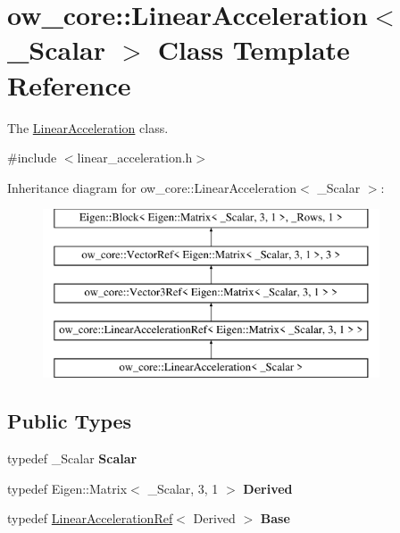 \hypertarget{classow__core_1_1LinearAcceleration}{}\section{ow\+\_\+core\+:\+:Linear\+Acceleration$<$ \+\_\+\+Scalar $>$ Class Template Reference}
\label{classow__core_1_1LinearAcceleration}


The \hyperlink{classow__core_1_1LinearAcceleration}{Linear\+Acceleration} class.  




{\ttfamily \#include $<$linear\+\_\+acceleration.\+h$>$}

Inheritance diagram for ow\+\_\+core\+:\+:Linear\+Acceleration$<$ \+\_\+\+Scalar $>$\+:\begin{figure}[H]
\begin{center}
\leavevmode
\includegraphics[height=5.000000cm]{d2/d41/classow__core_1_1LinearAcceleration}
\end{center}
\end{figure}
\subsection*{Public Types}
\begin{DoxyCompactItemize}
\item 
typedef \+\_\+\+Scalar {\bfseries Scalar}\hypertarget{classow__core_1_1LinearAcceleration_a11f5e96fae3ce2a9833d73dc64a9854c}{}\label{classow__core_1_1LinearAcceleration_a11f5e96fae3ce2a9833d73dc64a9854c}

\item 
typedef Eigen\+::\+Matrix$<$ \+\_\+\+Scalar, 3, 1 $>$ {\bfseries Derived}\hypertarget{classow__core_1_1LinearAcceleration_a964ade2d7efcfa7dd3876e779ccd13c5}{}\label{classow__core_1_1LinearAcceleration_a964ade2d7efcfa7dd3876e779ccd13c5}

\item 
typedef \hyperlink{classow__core_1_1LinearAccelerationRef}{Linear\+Acceleration\+Ref}$<$ Derived $>$ {\bfseries Base}\hypertarget{classow__core_1_1LinearAcceleration_ae577feb121ea5253b6d68b08f2d8af44}{}\label{classow__core_1_1LinearAcceleration_ae577feb121ea5253b6d68b08f2d8af44}

\end{DoxyCompactItemize}
